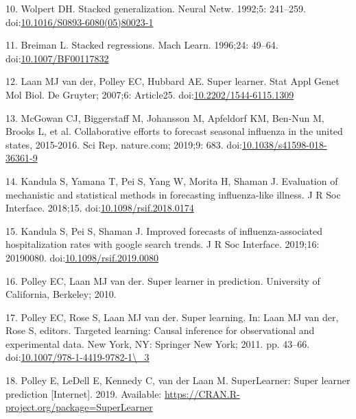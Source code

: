 \documentclass[10pt,letterpaper]{article}
\begin{document}
\leavevmode\hypertarget{ref-Wolpert1992-pw}{}%
10. Wolpert DH. Stacked generalization. Neural Netw. 1992;5: 241--259.
doi:\href{https://doi.org/10.1016/S0893-6080(05)80023-1}{10.1016/S0893-6080(05)80023-1}

\leavevmode\hypertarget{ref-Breiman1996-ez}{}%
11. Breiman L. Stacked regressions. Mach Learn. 1996;24: 49--64.
doi:\href{https://doi.org/10.1007/BF00117832}{10.1007/BF00117832}

\leavevmode\hypertarget{ref-Van_der_Laan2007-ml}{}%
12. Laan MJ van der, Polley EC, Hubbard AE. Super learner. Stat Appl
Genet Mol Biol. De Gruyter; 2007;6: Article25.
doi:\href{https://doi.org/10.2202/1544-6115.1309}{10.2202/1544-6115.1309}

\leavevmode\hypertarget{ref-McGowan2019-ph}{}%
13. McGowan CJ, Biggerstaff M, Johansson M, Apfeldorf KM, Ben-Nun M,
Brooks L, et al. Collaborative efforts to forecast seasonal influenza in
the united states, 2015-2016. Sci Rep. nature.com; 2019;9: 683.
doi:\href{https://doi.org/10.1038/s41598-018-36361-9}{10.1038/s41598-018-36361-9}

\leavevmode\hypertarget{ref-Kandula2018-sq}{}%
14. Kandula S, Yamana T, Pei S, Yang W, Morita H, Shaman J. Evaluation
of mechanistic and statistical methods in forecasting influenza-like
illness. J R Soc Interface. 2018;15.
doi:\href{https://doi.org/10.1098/rsif.2018.0174}{10.1098/rsif.2018.0174}

\leavevmode\hypertarget{ref-Kandula2019-tg}{}%
15. Kandula S, Pei S, Shaman J. Improved forecasts of
influenza-associated hospitalization rates with google search trends. J
R Soc Interface. 2019;16: 20190080.
doi:\href{https://doi.org/10.1098/rsif.2019.0080}{10.1098/rsif.2019.0080}

\leavevmode\hypertarget{ref-Polley2010-cb}{}%
16. Polley EC, Laan MJ van der. Super learner in prediction. University
of California, Berkeley; 2010.

\leavevmode\hypertarget{ref-Polley2011-oz}{}%
17. Polley EC, Rose S, Laan MJ van der. Super learning. In: Laan MJ van
der, Rose S, editors. Targeted learning: Causal inference for
observational and experimental data. New York, NY: Springer New York;
2011. pp. 43--66.
doi:\href{https://doi.org/10.1007/978-1-4419-9782-1/_3}{10.1007/978-1-4419-9782-1\textbackslash{}\_3}

\leavevmode\hypertarget{ref-Polley2019-sl}{}%
18. Polley E, LeDell E, Kennedy C, van der Laan M. SuperLearner: Super
learner prediction {[}Internet{]}. 2019. Available:
\url{https://CRAN.R-project.org/package=SuperLearner}
\end{document}
